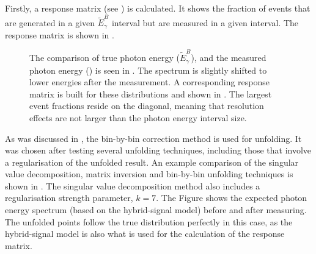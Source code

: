 Firstly, a response matrix (see ) is calculated.
It shows the fraction of events that are generated in a given $\tilde{E}_{\gamma}^B$ interval but are measured in a given \EB interval.
The response matrix is shown in .

\begin{figure}[htbp!]
    \centering
    \caption{\label{fig:unfolding_setup} The comparison of true photon energy ($\tilde{E}_{\gamma}^B$),
    and the measured photon energy (\EB) is seen in .
    The spectrum is slightly shifted to lower energies after the measurement.
    A corresponding response matrix is built for these distributions and shown in .
    The largest \BtoXsgamma event fractions reside on the diagonal, meaning that resolution effects are not larger than the photon energy interval size.
    }
\end{figure}

As was discussed in , the bin-by-bin correction method is used for unfolding.
It was chosen after testing several unfolding techniques, including those that involve a regularisation of the unfolded result.
An example comparison of the singular value decomposition, matrix inversion and bin-by-bin unfolding techniques is shown in .
The singular value decomposition method also includes a regularisation strength parameter, $k=7$.
The Figure shows the expected \BtoXsgamma photon energy spectrum (based on the hybrid-signal model) before and after measuring.
The unfolded points follow the true distribution perfectly in this case, as the hybrid-signal model is also what is used for the calculation of the response matrix.

